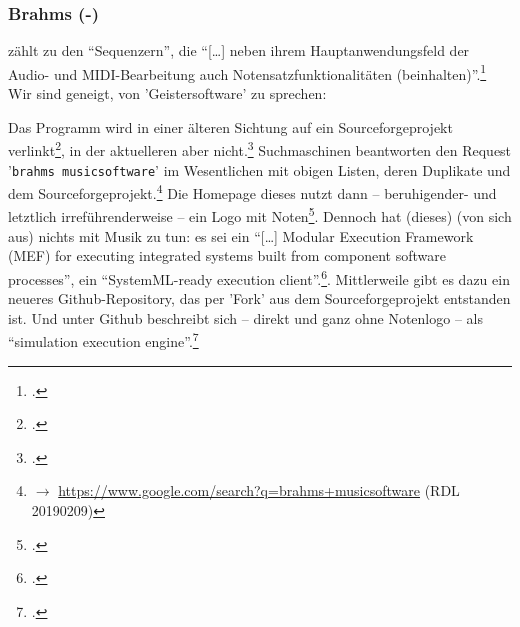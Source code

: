 %
%
%



\subsubsection{Brahms (-)}

\label{Brahms} zählt  zu den \enquote{Sequenzern},
die \enquote{[\ldots] neben ihrem Hauptanwendungsfeld der Audio- und
MIDI-Bearbeitung auch Notensatzfunktionalitäten
(beinhalten)}.\footcite[vgl.][\nopage wp]{WpedNotensatz2019a} Wir sind geneigt,
von 'Geistersoftware' zu sprechen:

Das Programm  wird in einer älteren Sichtung auf ein
Sourceforgeprojekt verlinkt\footcite[vgl.][\nopage wp]{Callon2009a}, in der
aktuelleren aber nicht.\footcite[vgl.][\nopage wp]{WpedNotensatz2019a}
Suchmaschinen beantworten den Request '\texttt{brahms musicsoftware}' im
Wesentlichen mit obigen Listen, deren Duplikate und dem
Sourceforgeprojekt.\footnote{$\rightarrow$
\href{https://www.google.com/search?q=brahms+musicsoftware}
{https://www.google.com/search?q=brahms+musicsoftware} (RDL 20190209)} Die
Homepage dieses  nutzt dann -- beruhigender-
und letztlich irreführenderweise -- ein Logo mit Noten\footcite[vgl.][\nopage
wp]{Brahms2013a}. Dennoch hat (dieses)  (von sich aus) nichts mit
Musik zu tun: es sei ein \enquote{[\ldots] Modular Execution Framework (MEF) for
executing integrated systems built from component software processes}, ein
\enquote{SystemML-ready execution client}.\footcite[vgl.][\nopage
wp]{Brahms2013b}. Mittlerweile gibt es dazu ein neueres Github-Repository, das
per 'Fork' aus dem Sourceforgeprojekt entstanden ist. Und unter Github
beschreibt sich  -- direkt und ganz ohne Notenlogo -- als
\enquote{simulation execution engine}.\footcite[vgl.][\nopage wp]{Brahms2018a}

